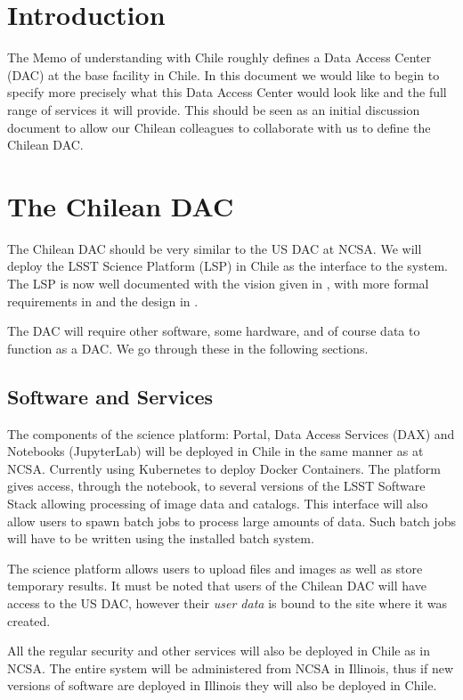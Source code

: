 \section{Introduction}


The Memo of understanding with Chile  roughly defines a Data Access Center (DAC) at the base facility in Chile.
In this document we would like to begin to specify more precisely what this Data Access Center would look like and the full range of services it will provide.
This should be seen as an initial discussion document to allow our Chilean colleagues to collaborate with us to define the Chilean DAC.

\section{The Chilean DAC}

The Chilean DAC should be very similar to the US DAC at NCSA.
We will deploy the LSST Science Platform (LSP) in Chile as the interface to the system.
The LSP is now well documented with the vision given in , with more formal requirements in  and the design in .

The DAC will require other software, some  hardware, and of course data to function as a DAC.
We go through these in the following sections.


\subsection{Software and Services}

The components of the science platform: Portal, Data Access Services (DAX) and Notebooks (JupyterLab) will be deployed in Chile in the same manner as at NCSA.
Currently using Kubernetes to deploy Docker Containers.
The platform gives access, through the notebook, to several versions of the LSST Software Stack allowing processing of image data and catalogs.
This interface will also allow users to spawn batch jobs to process large amounts of data.
Such batch jobs will have to be written using the installed batch system.

The science platform allows users to upload files and images as well as store temporary results.
It must be noted that users of the Chilean DAC will have access to the US DAC, however their \emph{user data} is bound to the site where it was created.

All the regular security and other services will also be deployed in Chile as in NCSA.
The entire system will be administered from NCSA in Illinois, thus if new versions of software are deployed in Illinois they will also be deployed in Chile.

